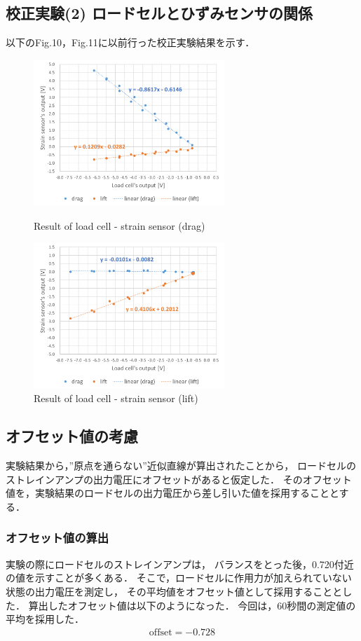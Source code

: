 \documentclass[twocolumn,a4j]{jsarticle}
\begin{document}
\subsection{校正実験(2) ロードセルとひずみセンサの関係}
以下のFig.10，Fig.11に以前行った校正実験結果を示す．
\begin{figure}[htbp]
    \footnotesize
    \begin{center}
        \includegraphics[width=72mm]{../images/calibration_2_drag.png}
        \caption{Result of load cell - strain sensor (drag)}
        \includegraphics[width=72mm]{../images/calibration_2_lift.png}
        \caption{Result of load cell - strain sensor (lift)}
    \end{center}
\end{figure}

\newpage
\subsection{オフセット値の考慮}
実験結果から，”原点を通らない”近似直線が算出されたことから，
ロードセルのストレインアンプの出力電圧にオフセットがあると仮定した．
そのオフセット値を，実験結果のロードセルの出力電圧から差し引いた値を採用することとする．\\
\subsubsection{オフセット値の算出}
実験の際にロードセルのストレインアンプは，
バランスをとった後，0.720付近の値を示すことが多くある．
そこで，ロードセルに作用力が加えられていない状態の出力電圧を測定し，
その平均値をオフセット値として採用することとした．
算出したオフセット値は以下のようになった．
今回は，60秒間の測定値の平均を採用した．
\begin{eqnarray*}
  \mathrm{offset} = -0.728
\end{eqnarray*}
\end{document}
